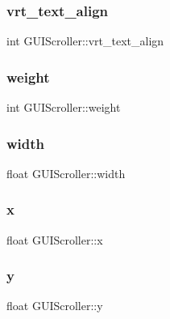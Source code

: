 \subsubsection{\texorpdfstring{vrt\+\_\+text\+\_\+align}{vrt\_text\_align}}
{\footnotesize\ttfamily int G\+U\+I\+Scroller\+::vrt\+\_\+text\+\_\+align}

\hypertarget{class_g_u_i_scroller_aa9c0aefa71eba9aa89e030468155ee3e}{}\label{class_g_u_i_scroller_aa9c0aefa71eba9aa89e030468155ee3e} 
\subsubsection{\texorpdfstring{weight}{weight}}
{\footnotesize\ttfamily int G\+U\+I\+Scroller\+::weight}

\hypertarget{class_g_u_i_scroller_a5f08a8e2b4e531e94c079e4e1c605c57}{}\label{class_g_u_i_scroller_a5f08a8e2b4e531e94c079e4e1c605c57} 
\subsubsection{\texorpdfstring{width}{width}}
{\footnotesize\ttfamily float G\+U\+I\+Scroller\+::width}

\hypertarget{class_g_u_i_scroller_ad1ce645b31df42b676d8132f7a9c4bfa}{}\label{class_g_u_i_scroller_ad1ce645b31df42b676d8132f7a9c4bfa} 
\subsubsection{\texorpdfstring{x}{x}}
{\footnotesize\ttfamily float G\+U\+I\+Scroller\+::x}

\hypertarget{class_g_u_i_scroller_afa01a0d3738f57a61b0a01bd5d1c1b08}{}\label{class_g_u_i_scroller_afa01a0d3738f57a61b0a01bd5d1c1b08} 
\subsubsection{\texorpdfstring{y}{y}}
{\footnotesize\ttfamily float G\+U\+I\+Scroller\+::y}

